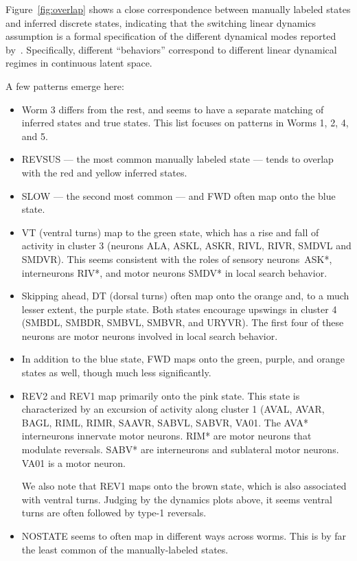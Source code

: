 \documentclass{article}
\begin{document}
Figure~\ref{fig:overlap} shows a close correspondence between manually
labeled states and inferred discrete states, indicating that the
switching linear dynamics assumption is a formal specification of the
different dynamical modes reported by~\citet{kato2015global}.
Specifically, different ``behaviors'' correspond to different linear
dynamical regimes in continuous latent space.

A few patterns emerge here:
\begin{itemize}
\item Worm 3 differs from the rest, and seems to have a separate
  matching of inferred states and true states.  This list focuses
  on patterns in Worms 1, 2, 4, and 5. 
\item \textsf{REVSUS} --- the most common manually labeled state ---
  tends to overlap with the red and yellow inferred states.
\item \textsf{SLOW} --- the second most common --- and \textsf{FWD}
  often map onto the blue state.
\item \textsf{VT} (ventral turns) map to the green state, which
  has a rise and fall of activity in cluster 3 (neurons
  {\sf ALA, ASKL, ASKR, RIVL, RIVR, SMDVL} and \textsf{SMDVR}).
  This seems consistent with the roles of sensory neurons~\textsf{ASK*},
  interneurons \textsf{RIV*}, and motor neurons \textsf{SMDV*} in
  local search behavior.
\item Skipping ahead, \textsf{DT} (dorsal turns) often map onto
  the orange and, to a much lesser extent, the purple state. Both
  states encourage upswings in cluster 4 ({\sf SMBDL, SMBDR, SMBVL, SMBVR}, and \textsf{URYVR}).
  The first four of these neurons are motor neurons involved in
  local search behavior. 
\item In addition to the blue state, \textsf{FWD} maps onto the
  green, purple, and orange states as well, though much less significantly.
\item \textsf{REV2} and \textsf{REV1} map primarily onto the pink state.
  This state is characterized by an excursion of activity along cluster
  1 ({\sf AVAL, AVAR, BAGL, RIML, RIMR, SAAVR, SABVL, SABVR, VA01}.
  The \textsf{AVA*} interneurons innervate motor neurons.
  \textsf{RIM*} are motor neurons that modulate reversals.
  \textsf{SABV*} are interneurons and sublateral motor neurons.
  \textsf{VA01} is a motor neuron.

  We also note that \textsf{REV1} maps onto the brown state, which
  is also associated with ventral turns. Judging by the dynamics plots above,
  it seems ventral turns are often followed by type-1 reversals.
\item \textsf{NOSTATE} seems to often map in different ways across worms.
  This is by far the least common of the manually-labeled states.
\end{itemize}
\end{document}
